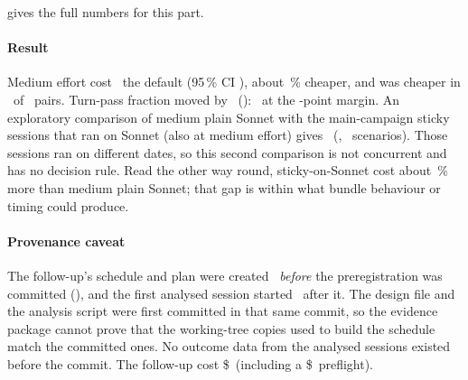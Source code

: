  gives the full numbers for this part.

\begin{table}[tbp]
\centering\small
\caption{Effort-control follow-up (evidence package in \cref{tab:evidence}). Cost rows are
geometric-mean ratios of tools-normalized session cost; below 1 means the first arm is cheaper.}
\label{vt:tab:effortfollow}

\end{table}

\paragraph{Result} Medium effort cost \EcRatio\X\ the default (95\,\% CI \EcCI), about \EcCutPct\,\% cheaper, and
was cheaper in \EcCheaperPairs\ of \EcPairs\ pairs. Turn-pass fraction moved by \EcQual\ (\EcQualCI): \EcQualVerdict\
at the \NIMarginPts-point margin. An exploratory comparison of medium plain Sonnet with the main-campaign sticky
sessions that ran on Sonnet (also at medium effort) gives \EcSecRatio\ (\EcSecCI, \EcSecN\ scenarios). Those
sessions ran on different dates, so this second comparison is not concurrent and has no decision rule. Read the
other way round, sticky-on-Sonnet cost about \EcSecGapPct\,\% more than medium plain Sonnet; that gap is within what
bundle behaviour or timing could produce.

\paragraph{Provenance caveat} The follow-up's schedule and plan were created \EcScheduleBefore\ \emph{before} the
preregistration was committed (\code{\EcPreregSha}), and the first analysed session started \EcFirstAfter\ after it.
The design file and the analysis script were first committed in that same commit, so the evidence package cannot
prove that the working-tree copies used to build the schedule match the committed ones. No outcome data from the
analysed sessions existed before the commit. The follow-up cost \$\EcSpend\ (including a \$\EcPreflight\ preflight).

